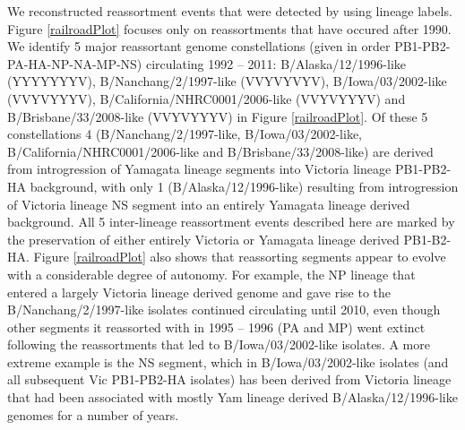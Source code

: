 \documentclass[11pt,oneside,letterpaper]{article}
\begin{document}
We reconstructed reassortment events that were detected by using lineage labels.
Figure \ref{railroadPlot} focuses only on reassortments that have occured after 1990.
We identify 5 major reassortant genome constellations (given in order PB1-PB2-PA-HA-NP-NA-MP-NS) circulating 1992 -- 2011: B/Alaska/12/1996-like (YYYYYYYV), B/Nanchang/2/1997-like (VVYVYVYV), B/Iowa/03/2002-like (VVYVYYYV), B/California/NHRC0001/2006-like (VVYVYYYV) and B/Brisbane/33/2008-like (VVYVYYYV) in Figure \ref{railroadPlot}.
Of these 5 constellations 4 (B/Nanchang/2/1997-like, B/Iowa/03/2002-like, B/California/NHRC0001/2006-like and B/Brisbane/33/2008-like) are derived from introgression of Yamagata lineage segments into Victoria lineage PB1-PB2-HA background, with only 1 (B/Alaska/12/1996-like) resulting from introgression of Victoria lineage NS segment into an entirely Yamagata lineage derived background.
All 5 inter-lineage reassortment events described here are marked by the preservation of either entirely Victoria or Yamagata lineage derived PB1-B2-HA.
Figure \ref{railroadPlot} also shows that reassorting segments appear to evolve with a considerable degree of autonomy.
For example, the NP lineage that entered a largely Victoria lineage derived genome and gave rise to the B/Nanchang/2/1997-like isolates continued circulating until 2010, even though other segments it reassorted with in 1995 -- 1996 (PA and MP) went extinct following the reassortments that led to B/Iowa/03/2002-like isolates.
A more extreme example is the NS segment, which in B/Iowa/03/2002-like isolates (and all subsequent Vic PB1-PB2-HA isolates) has been derived from Victoria lineage that had been associated with mostly Yam lineage derived B/Alaska/12/1996-like genomes for a number of years.
\end{document}

